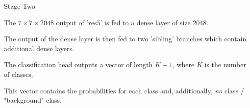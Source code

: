 \begin{frame} {Stage Two}
  \begin{figure}
    \centering
  \end{figure}
    \begin{itemize}
      \item \small{The $7 \times 7 \times 2048$ output of 'res5' is fed to a dense layer of size 2048.
      \item The output of the dense layer is then fed to two 'sibling' branches which contain additional dense layers.
      \item The classification head outputs a vector of length $K+1$, where $K$ is the number of classes.
      \item This vector contains the probabilities for each class and, additionally, \textit{no} class / "background" class.}
    \end{itemize}
\end{frame}

